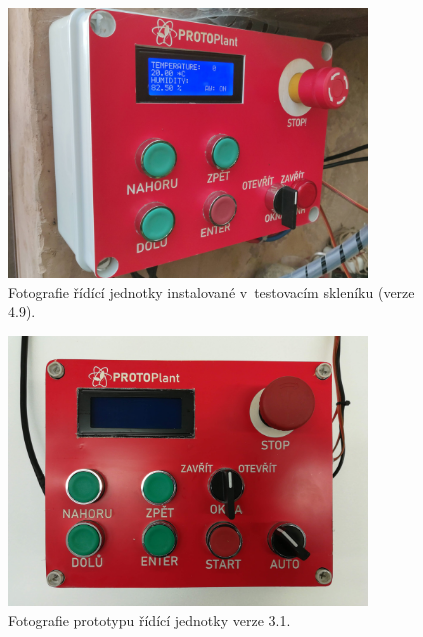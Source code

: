 \begin{figure}[htbp]
    \centering
    \includegraphics[width=0.85\textwidth]{img/PHOTOS/ControlUnit1.jpg}
    \caption{Fotografie řídící jednotky instalované v~testovacím skleníku (verze 4.9).}
    \label{fig:PPCU1}
\end{figure}

\begin{figure}[htbp]
    \centering
    \includegraphics[width=0.85\textwidth]{img/PHOTOS/ControlUnit2.jpg}
    \caption{Fotografie prototypu řídící jednotky verze 3.1.}
    \label{fig:PPCU2}
\end{figure}

